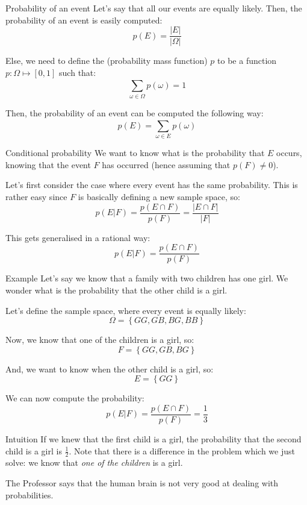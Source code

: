 \documentclass[a4paper]{article}
\begin{document}
\begin{parag}{Probability of an event}
    Let's say that all our events are equally likely. Then, the probability of an event is easily computed:
    \[p\left(E\right) = \frac{\left|E\right|}{\left|\Omega\right|}\]

    Else, we need to define the  (probability mass function) $p$ to be a function $p: \Omega \mapsto \left[0, 1\right]$ such that:
    \[\sum_{\omega \in \Omega}^{} p\left(\omega\right) = 1\]

    Then, the probability of an event can be computed the following way:
    \[p\left(E\right) = \sum_{\omega \in E}^{} p\left(\omega\right)\]

\end{parag}

\begin{parag}{Conditional probability}
    We want to know what is the probability that $E$ occurs, knowing that the event $F$ has occurred (hence assuming that $p\left(F\right) \neq 0$).

    Let's first consider the case where every event has the same probability. This is rather easy since $F$ is basically defining a new sample space, so:
    \[p\left(E | F\right) = \frac{p\left(E \cap F\right)}{p\left(F\right)}= \frac{\left|E \cap F\right|}{\left|F\right|}\]

    This gets generalised in a rational way:
    \[p\left(E | F\right) = \frac{p\left(E \cap F\right)}{p\left(F\right)}\]

\end{parag}

\begin{parag}{Example}
    Let's say we know that a family with two children has one girl. We wonder what is the probability that the other child is a girl.

    Let's define the sample space, where every event is equally likely:
    \[\Omega = \left\{GG, GB, BG, BB\right\}\]

    Now, we know that one of the children is a girl, so:
    \[F = \left\{GG, GB, BG\right\}\]

    And, we want to know when the other child is a girl, so:
    \[E = \left\{GG\right\}\]

    We can now compute the probability:
    \[p\left(E | F\right) = \frac{p\left(E \cap F\right)}{p\left(F\right)} = \frac{1}{3}\]

    \begin{subparag}{Intuition}
        If we knew that the first child is a girl, the probability that the second child is a girl is $\frac{1}{2}$. Note that there is a difference in the problem which we just solve: we know that \textit{one of the children} is a girl.

        The Professor says that the human brain is not very good at dealing with probabilities.
    \end{subparag}
\end{parag}
\end{document}
